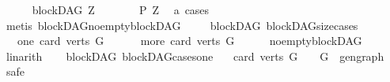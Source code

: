 \begin{isabellebody}
\ \ \ \ \isamarkupfalse%
\ {\isachardoublequoteopen}blockDAG\ Z{\isachardoublequoteclose}\isanewline
\ \ \ \ \isamarkupfalse%
\ \isamarkupfalse%
\ {\isachardoublequoteopen}P\ Z{\isachardoublequoteclose}\ \isamarkupfalse%
\ a\ cases\isanewline
\ \ \ \ \ \ \isamarkupfalse%
\ {\isacharparenleft}{\kern0pt}metis\ blockDAG{\isachardot}{\kern0pt}no{\isacharunderscore}{\kern0pt}empty{\isacharunderscore}{\kern0pt}blockDAG{\isacharparenright}{\kern0pt}\isanewline
\ \ \isamarkupfalse%
\isanewline
{}\isamarkupfalse%
%
\endisatagproof
{\isafoldproof}%
%
\isadelimproof
\isanewline
%
\endisadelimproof
\isanewline
{}\isamarkupfalse%
\ {\isacharparenleft}{\kern0pt}\ blockDAG{\isacharparenright}{\kern0pt}\ blockDAG{\isacharunderscore}{\kern0pt}size{\isacharunderscore}{\kern0pt}cases{\isacharcolon}{\kern0pt}\isanewline
\ \ \ {\isacharparenleft}{\kern0pt}one{\isacharparenright}{\kern0pt}\ {\isachardoublequoteopen}card\ {\isacharparenleft}{\kern0pt}verts\ G{\isacharparenright}{\kern0pt}\ {\isacharequal}{\kern0pt}\ {}{\isachardoublequoteclose}\ \isanewline
\ \ {\isacharbar}{\kern0pt}\ {\isacharparenleft}{\kern0pt}more{\isacharparenright}{\kern0pt}\ {\isachardoublequoteopen}card\ {\isacharparenleft}{\kern0pt}verts\ G{\isacharparenright}{\kern0pt}\ {\isachargreater}{\kern0pt}\ {}{\isachardoublequoteclose}\isanewline
%
\isadelimproof
\ \ %
\endisadelimproof
%
\isatagproof
{}\isamarkupfalse%
\ no{\isacharunderscore}{\kern0pt}empty{\isacharunderscore}{\kern0pt}blockDAG\isanewline
\ \ \isamarkupfalse%
\ linarith%
\endisatagproof
{\isafoldproof}%
%
\isadelimproof
\ \isanewline
%
\endisadelimproof
\isanewline
{}\isamarkupfalse%
\ {\isacharparenleft}{\kern0pt}\ blockDAG{\isacharparenright}{\kern0pt}\ blockDAG{\isacharunderscore}{\kern0pt}cases{\isacharunderscore}{\kern0pt}one{\isacharcolon}{\kern0pt}\isanewline
\ \ \ {\isachardoublequoteopen}card\ {\isacharparenleft}{\kern0pt}verts\ G{\isacharparenright}{\kern0pt}\ {\isacharequal}{\kern0pt}\ {}\ {\isasymlongrightarrow}\ {\isacharparenleft}{\kern0pt}G\ {\isacharequal}{\kern0pt}\ gen{\isacharunderscore}{\kern0pt}graph{\isacharparenright}{\kern0pt}{\isachardoublequoteclose}\isanewline
%
\isadelimproof
%
\endisadelimproof
%
\isatagproof
{}\isamarkupfalse%
\ {\isacharparenleft}{\kern0pt}safe{\isacharparenright}{\kern0pt}\isanewline
\ \ \isamarkupfalse%

\end{isabellebody}
